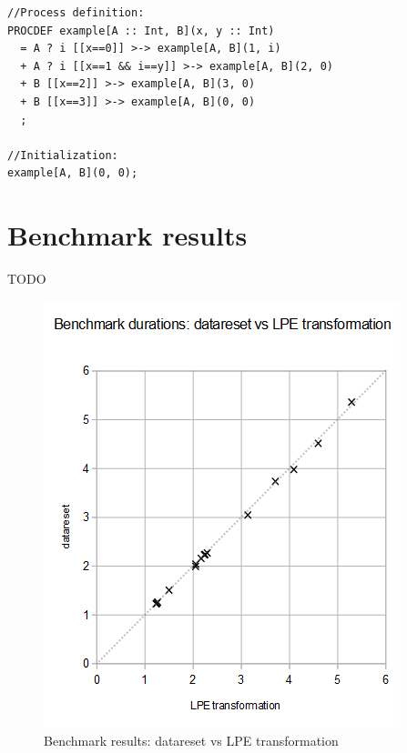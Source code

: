 \begin{lstlisting}
//Process definition:
PROCDEF example[A :: Int, B](x, y :: Int)
  = A ? i [[x==0]] >-> example[A, B](1, i)
  + A ? i [[x==1 && i==y]] >-> example[A, B](2, 0)
  + B [[x==2]] >-> example[A, B](3, 0)
  + B [[x==3]] >-> example[A, B](0, 0)
  ;

//Initialization:
example[A, B](0, 0);
\end{lstlisting}

\section{Benchmark results}

TODO

\begin{figure}[!ht]
\begin{center}
\includegraphics[width=0.7\linewidth]{charts/datareset-vs-lpe-only}
\caption{Benchmark results: datareset vs LPE transformation}
\label{datareset-vs-lpe-only:fig}
\end{center}
\end{figure}

